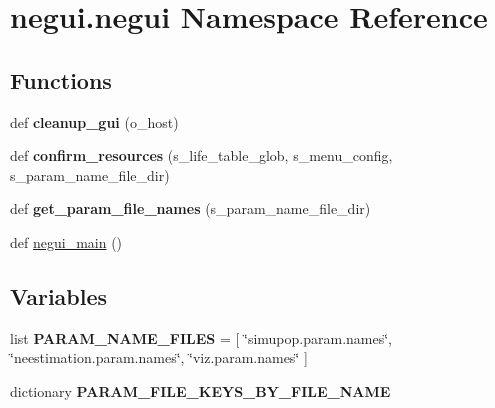 \hypertarget{namespacenegui_1_1negui}{}\section{negui.\+negui Namespace Reference}
\label{namespacenegui_1_1negui}
\subsection*{Functions}
\begin{DoxyCompactItemize}
\item 
def {\bfseries cleanup\+\_\+gui} (o\+\_\+host)\hypertarget{namespacenegui_1_1negui_a633f9fe59f5e342abb4e0902629dbfd4}{}\label{namespacenegui_1_1negui_a633f9fe59f5e342abb4e0902629dbfd4}

\item 
def {\bfseries confirm\+\_\+resources} (s\+\_\+life\+\_\+table\+\_\+glob, s\+\_\+menu\+\_\+config, s\+\_\+param\+\_\+name\+\_\+file\+\_\+dir)\hypertarget{namespacenegui_1_1negui_aa8e9d885a42354240dbcc33d8f06e562}{}\label{namespacenegui_1_1negui_aa8e9d885a42354240dbcc33d8f06e562}

\item 
def {\bfseries get\+\_\+param\+\_\+file\+\_\+names} (s\+\_\+param\+\_\+name\+\_\+file\+\_\+dir)\hypertarget{namespacenegui_1_1negui_a2b414be2cea7913bf71c4c35b5c1e015}{}\label{namespacenegui_1_1negui_a2b414be2cea7913bf71c4c35b5c1e015}

\item 
def \hyperlink{namespacenegui_1_1negui_a3ae02c04d1a16d3a3f855196fa2be244}{negui\+\_\+main} ()
\end{DoxyCompactItemize}
\subsection*{Variables}
\begin{DoxyCompactItemize}
\item 
list {\bfseries P\+A\+R\+A\+M\+\_\+\+N\+A\+M\+E\+\_\+\+F\+I\+L\+ES} = \mbox{[} \char`\"{}simupop.\+param.\+names\char`\"{}, \char`\"{}neestimation.\+param.\+names\char`\"{}, \char`\"{}viz.\+param.\+names\char`\"{} \mbox{]}\hypertarget{namespacenegui_1_1negui_a6257f75fe3ed7fe0b5a4cff4cb694e47}{}\label{namespacenegui_1_1negui_a6257f75fe3ed7fe0b5a4cff4cb694e47}

\item 
dictionary {\bfseries P\+A\+R\+A\+M\+\_\+\+F\+I\+L\+E\+\_\+\+K\+E\+Y\+S\+\_\+\+B\+Y\+\_\+\+F\+I\+L\+E\+\_\+\+N\+A\+ME}
\end{DoxyCompactItemize}


